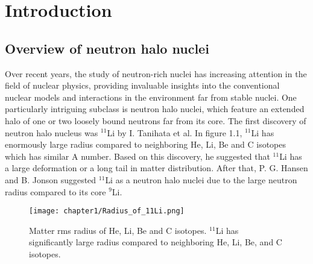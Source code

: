\chapter{Introduction}

\section{Overview of neutron halo nuclei}
Over recent years, the study of neutron-rich nuclei has increasing attention in the field of nuclear physics, providing invaluable insights into the conventional nuclear models and interactions in the environment far from stable nuclei. One particularly intriguing subclass is neutron halo nuclei\cite{Tanihata96}, which feature an extended halo of one or two loosely bound neutrons far from its core. The first discovery of neutron halo nucleus was ${}^{11}$Li by I. Tanihata et al\cite{Tanihata85}. 
In figure 1.1, ${}^{11}$Li has enormously large radius compared to neighboring  He, Li, Be and C isotopes which has similar A number. Based on this discovery, he suggested that ${}^{11}$Li has a large deformation or a long tail in matter distribution. After that, P. G. Hansen and B. Jonson\cite{HansenandJonson} suggested ${}^{11}$Li as a neutron halo nuclei due to the large neutron radius compared to its core ${}^{9}$Li.

\begin{figure}
    \centering
    \texttt{[image: chapter1/Radius\_of\_11Li.png]}
    \caption[Matter rms radius of He, Li, Be and C isotopes.]{Matter rms radius of He, Li, Be and C isotopes. ${}^{11}$Li has significantly large radius compared to neighboring He, Li, Be, and C isotopes. \cite{Tanihata85}}
    \label{fig:Radius_11Li}
\end{figure}

